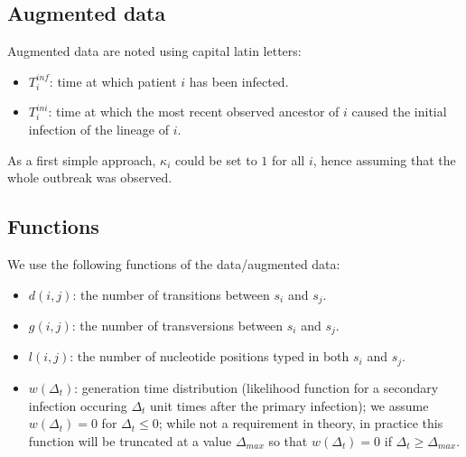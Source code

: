 \documentclass[10pt]{article}
\begin{document}
\subsection*{Augmented data}
Augmented data are noted using capital latin letters:
\begin{itemize}
	\item $T_i^{inf}$: time at which patient $i$ has been infected.
	\item $T_i^{ini}$: time at which the most recent observed ancestor of $i$ caused the initial infection of the lineage of $i$. 
\end{itemize}

As a first simple approach, $\kappa_i$ could be set to $1$ for all $i$, hence assuming that the whole outbreak was observed.



\subsection*{Functions}
We use the following functions of the data/augmented data:
\begin{itemize}
	\item $d(i,j)$: the number of transitions between $s_i$ and $s_j$.
 	\item $g(i,j)$: the number of transversions between $s_i$ and $s_j$.
 	\item $l(i,j)$: the number of nucleotide positions typed in both $s_i$ and $s_j$.
 	\item $w(\Delta_t)$: generation time distribution (likelihood function for a secondary infection occuring $\Delta_t$ unit times after the primary infection); we assume $w(\Delta_t)=0$ for $\Delta_t \leq 0$; while not a requirement in theory, in practice this function will be truncated at a value $\Delta_{max}$ so that $w(\Delta_t)=0$ if $\Delta_t \geq \Delta_{max}$.
\end{itemize}
\end{document}
